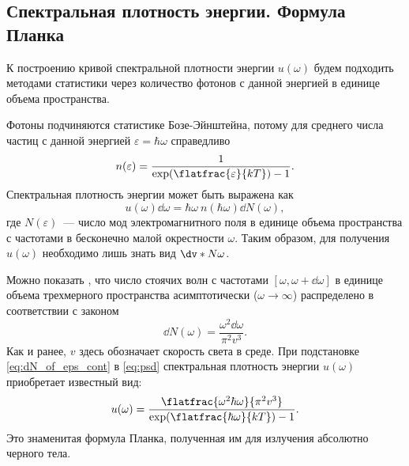 %
%
%
%
%
%

\subsection{Спектральная плотность энергии. Формула Планка}

    К построению кривой спектральной плотности энергии $u(\omega)$ будем подходить методами статистики через количество фотонов с данной энергией в единице объема пространства.

    Фотоны подчиняются статистике Бозе-Эйнштейна, потому для среднего числа частиц с данной энергией $\varepsilon = \hbar \omega$ справедливо
    \begin{equation}
        n(\varepsilon) = \frac{1}{\exp(\flatfrac{\varepsilon}{kT}) - 1} .
    \end{equation}
    Спектральная плотность энергии может быть выражена как
    \begin{equation}\label{eq:psd}
        u(\omega) \dd{\omega} = \hbar\omega\ n(\hbar\omega) \dd{N(\omega)} ,
    \end{equation}
    где $N(\varepsilon)$~--- число мод электромагнитного поля в единице объема пространства с частотами в бесконечно малой окрестности $\omega$. Таким образом, для получения $u(\omega)$ необходимо лишь знать вид $\dv*{N}{\omega}$.

    Можно показать \cite{sivuhin_opt}, что число стоячих волн с частотами $[\omega,\omega+\dd{\omega}]$ в единице объема трехмерного пространства асимптотически ($\omega \to \infty$) распределено в соответствии с законом
    \begin{equation}\label{eq:dN_of_eps_cont}
        \dd{N(\omega)} = \frac{\omega^2 \dd{\omega}}{\pi^2 v^3} .
    \end{equation}
    Как и ранее, $v$ здесь обозначает скорость света в среде. При подстановке \autoref{eq:dN_of_eps_cont} в \autoref{eq:psd} спектральная плотность энергии $u(\omega)$ приобретает известный вид:
    \begin{equation}
        u(\omega) = \frac{
                \flatfrac{\omega^2 \hbar\omega}{\pi^2 v^3}
        }{\exp(\flatfrac{\hbar\omega}{kT}) - 1} .
    \end{equation}
    Это знаменитая формула Планка, полученная им для излучения абсолютно черного тела.

